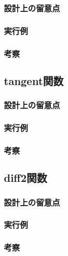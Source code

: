 \documentclass[11pt,a4paper, uplatex]{jsarticle}
\begin{document}
\subsubsection{設計上の留意点}
\subsubsection{実行例}
\subsubsection{考察}

\subsection{tangent関数}
\subsubsection{設計上の留意点}
\subsubsection{実行例}
\subsubsection{考察}

\subsection{diff2関数}
\subsubsection{設計上の留意点}
\subsubsection{実行例}
\subsubsection{考察}
\end{document}

